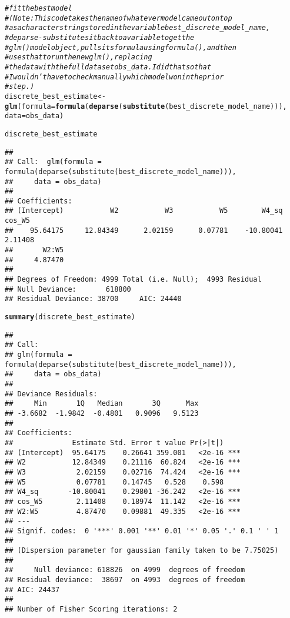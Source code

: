 \documentclass{article}\usepackage[]{graphicx}\usepackage[]{xcolor}
\makeatletter
\newcommand{\hlcom}[1]{\textcolor[rgb]{0.678,0.584,0.686}{\textit{#1}}}%
\newcommand{\hlstd}[1]{\textcolor[rgb]{0.345,0.345,0.345}{#1}}%
\newcommand{\hlkwb}[1]{\textcolor[rgb]{0.69,0.353,0.396}{#1}}%
\newcommand{\hlkwc}[1]{\textcolor[rgb]{0.333,0.667,0.333}{#1}}%
\newcommand{\hlkwd}[1]{\textcolor[rgb]{0.737,0.353,0.396}{\textbf{#1}}}%
\newenvironment{kframe}{%
 \def\at@end@of@kframe{}%
 \ifinner\ifhmode%
  \def\at@end@of@kframe{\end{minipage}}%
  \begin{minipage}{\columnwidth}%
 \fi\fi%
 \def\FrameCommand##1{\hskip\@totalleftmargin \hskip-\fboxsep
 \colorbox{shadecolor}{##1}\hskip-\fboxsep
     \hskip-\linewidth \hskip-\@totalleftmargin \hskip\columnwidth}%
 \MakeFramed {\advance\hsize-\width
   \@totalleftmargin\z@ \linewidth\hsize
   \@setminipage}}%
 {\par\unskip\endMakeFramed%
 \at@end@of@kframe}
\newenvironment{knitrout}{}{} %
\makeatother
\begin{document}
\begin{knitrout}
\color{fgcolor}\begin{kframe}
\begin{alltt}
\hlcom{# fit the best model }
\hlcom{# (Note: This code takes the name of whatever model came out on top}
\hlcom{#  as a character string stored in the variable best_discrete_model_name,}
\hlcom{#  deparse-substitutes it back to a variable to get the }
\hlcom{#  glm() model object, pulls its formula using formula(), and then }
\hlcom{#  uses that to run the new glm(), replacing}
\hlcom{#  the data with the full dataset obs_data. I did that so that }
\hlcom{#  I wouldn't have to check manually which model won in the prior}
\hlcom{#  step.)}
\hlstd{discrete_best_estimate} \hlkwb{<-}
  \hlkwd{glm}\hlstd{(}\hlkwc{formula} \hlstd{=} \hlkwd{formula}\hlstd{(}\hlkwd{deparse}\hlstd{(}\hlkwd{substitute}\hlstd{(best_discrete_model_name))),}
      \hlkwc{data} \hlstd{= obs_data)}

\hlstd{discrete_best_estimate}
\end{alltt}
\begin{verbatim}
## 
## Call:  glm(formula = formula(deparse(substitute(best_discrete_model_name))), 
##     data = obs_data)
## 
## Coefficients:
## (Intercept)           W2           W3           W5        W4_sq       cos_W5  
##    95.64175     12.84349      2.02159      0.07781    -10.80041      2.11408  
##       W2:W5  
##     4.87470  
## 
## Degrees of Freedom: 4999 Total (i.e. Null);  4993 Residual
## Null Deviance:	    618800 
## Residual Deviance: 38700 	AIC: 24440
\end{verbatim}
\begin{alltt}
\hlkwd{summary}\hlstd{(discrete_best_estimate)}
\end{alltt}
\begin{verbatim}
## 
## Call:
## glm(formula = formula(deparse(substitute(best_discrete_model_name))), 
##     data = obs_data)
## 
## Deviance Residuals: 
##     Min       1Q   Median       3Q      Max  
## -3.6682  -1.9842  -0.4801   0.9096   9.5123  
## 
## Coefficients:
##              Estimate Std. Error t value Pr(>|t|)    
## (Intercept)  95.64175    0.26641 359.001   <2e-16 ***
## W2           12.84349    0.21116  60.824   <2e-16 ***
## W3            2.02159    0.02716  74.424   <2e-16 ***
## W5            0.07781    0.14745   0.528    0.598    
## W4_sq       -10.80041    0.29801 -36.242   <2e-16 ***
## cos_W5        2.11408    0.18974  11.142   <2e-16 ***
## W2:W5         4.87470    0.09881  49.335   <2e-16 ***
## ---
## Signif. codes:  0 '***' 0.001 '**' 0.01 '*' 0.05 '.' 0.1 ' ' 1
## 
## (Dispersion parameter for gaussian family taken to be 7.75025)
## 
##     Null deviance: 618826  on 4999  degrees of freedom
## Residual deviance:  38697  on 4993  degrees of freedom
## AIC: 24437
## 
## Number of Fisher Scoring iterations: 2
\end{verbatim}
\end{kframe}
\end{knitrout}
\end{document}
